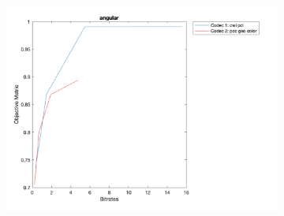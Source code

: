 \documentclass{article}
\begin{document}
\begin{figure}
    \begin{subfigure}[b]{0.65\textwidth}
    \includegraphics[width=\textwidth]{Figures/task2/phil_angular.png}
    \end{subfigure}

\end{figure}
\end{document}
